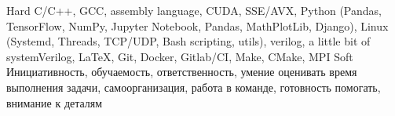 

\begin{cvskills}

  \cvskill
    {Hard} %
    {C/C++, GCC, assembly language, CUDA, SSE/AVX, Python (Pandas, TensorFlow, NumPy, Jupyter Notebook, Pandas, MathPlotLib, Django), Linux (Systemd, Threads, TCP/UDP, Bash scripting, utils), verilog, a little bit of systemVerilog, \LaTeX, Git, Docker, Gitlab/CI, Make, CMake, MPI} %
  \cvskill
    {Soft} %
    {Инициативность, обучаемость, ответственность, умение оценивать время выполнения задачи, самоорганизация, работа в команде, готовность помогать, внимание к деталям} %

\end{cvskills}
